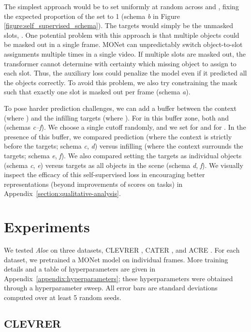 \documentclass{article}
\newcommand{\Model}{\emph{Aloe}}
\begin{document}
The simplest approach would be to set  uniformly at random across  and , fixing the expected proportion of the  set to 1
(schema \emph{b} in Figure \ref{figure:self_supervised_schema}).
The targets would simply be the unmasked slots, .
One potential problem with this approach is 
that multiple objects could be masked out in a single frame.
MONet can unpredictably switch object-to-slot assignments multiple times in a single video.
If multiple slots are masked out,
the transformer cannot determine with certainty which missing object to assign to each slot.
Thus, the auxiliary loss could penalize the model even if it predicted all the objects correctly.
To avoid this problem, we also try constraining the mask such that exactly one slot
is masked out per frame (schema \emph{a}).

To pose harder prediction challenges,
we can add a buffer between the context (where ) and the infilling targets (where ).
For  in this buffer zone, both  and  (schemas \emph{c--f}).
We choose a single cutoff   randomly,
and we set  for  and  for .
In the presence of this buffer, we compared prediction (where the context is strictly before the targets; schema \emph{c}, \emph{d}) versus infilling (where the context surrounds the targets; schema \emph{e}, \emph{f}).
We also compared setting the targets as individual objects (schema \emph{c}, \emph{e}) versus targets as all objects in the scene (schema \emph{d}, \emph{f}).
We visually inspect the efficacy of this self-supervised loss in encouraging better representations (beyond improvements of scores on tasks)
in Appendix~\ref{section:qualitative-analysis}.



\section{Experiments}
We tested \Model{} on three datasets, CLEVRER \citep{clevrer}, CATER \citep{cater}, and ACRE \citep{acre}.
For each dataset, we pretrained a MONet model on individual frames.
 More training details and a table of hyperparameters
are given in Appendix~\ref{appendix:hyperparameters}; these hyperparameters were obtained through a hyperparameter sweep.
All error bars are standard deviations computed over at least 5 random seeds.

\subsection{CLEVRER}
\label{section:clevrer}
\end{document}
